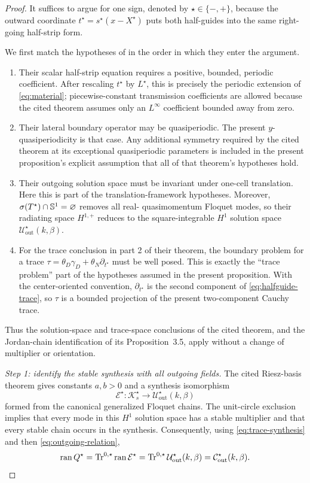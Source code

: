 \begin{proof}
It suffices to argue for one sign, denoted by
$\star\in\{-,+\}$, because the outward coordinate
$t^\star=s^\star(x-X^\star)$ puts both half-guides into the same right-going
half-strip form.

We first match the hypotheses of
\cite[Theorem~2.2 and Proposition~3.5]{HohageSoussi2013} in the order in
which they enter the argument.
\begin{enumerate}[label=\textup{(\arabic*)},leftmargin=*]
  \item Their scalar half-strip equation requires a positive, bounded,
  periodic coefficient.  After rescaling $t^\star$ by $L^\star$, this is
  precisely the periodic extension of \eqref{eq:material}; piecewise-constant
  transmission coefficients are allowed because the cited theorem assumes
  only an $L^\infty$ coefficient bounded away from zero.
  \item Their lateral boundary operator may be quasiperiodic.  The present
  $y$-quasiperiodicity is that case.  Any additional symmetry required by the
  cited theorem at its exceptional quasiperiodic parameters is included in
  the present proposition's explicit assumption that all of that theorem's
  hypotheses hold.
  \item Their outgoing solution space must be invariant under one-cell
  translation.  Here this is part of the translation-framework hypotheses.
  Moreover, $\sigma(T^\star)\cap\mathbb{S}^{1}=\varnothing$ removes all real-
  quasimomentum Floquet modes, so their radiating space
  $H^{1,+}$ reduces to the square-integrable $H^1$ solution space
  $\mathcal U^\star_{\mathrm{out}}(k,\beta)$.
  \item For the trace conclusion in part 2 of their theorem, the boundary
  problem for a trace
  $\tau=\theta_D\gamma_D+\theta_N\partial_{t^\star}$ must be well posed.
  This is exactly the ``trace problem'' part of the hypotheses assumed in the
  present proposition.  With the center-oriented convention,
  $\partial_{t^\star}$ is the second component of
  \eqref{eq:halfguide-trace}, so $\tau$ is a bounded projection of the present
  two-component Cauchy trace.
\end{enumerate}
Thus the solution-space and trace-space conclusions of the cited theorem,
and the Jordan-chain identification of its Proposition~3.5, apply without a
change of multiplier or orientation.

\emph{Step 1: identify the stable synthesis with all outgoing fields.}
The cited Riesz-basis theorem gives constants $a,b>0$ and a synthesis
isomorphism
\[
  \mathcal E^\star:\mathcal K_s^\star
  \longrightarrow\mathcal U^\star_{\mathrm{out}}(k,\beta)
\]
formed from the canonical generalized Floquet chains.  The unit-circle
exclusion implies that every mode in this $H^1$ solution space has a stable
multiplier and that every stable chain occurs in the synthesis.  Consequently,
using \eqref{eq:trace-synthesis} and then
\eqref{eq:outgoing-relation},
\[
  \operatorname{ran} Q^\star
  =\operatorname{Tr}^{0,\star}\operatorname{ran}\mathcal E^\star
  =\operatorname{Tr}^{0,\star}\mathcal U^\star_{\mathrm{out}}(k,\beta)
  =\mathcal C^\star_{\mathrm{out}}(k,\beta).
\]


\end{proof}
